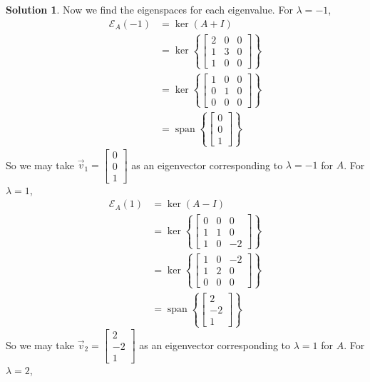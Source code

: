 \documentclass[11pt]{article}
\theoremstyle{definition}\newtheorem{definition}{Definition}
\theoremstyle{definition}\newtheorem{question}{Question}
\theoremstyle{definition}\newtheorem*{solution}{Solution}
\theoremstyle{definition}\newtheorem{example}{Example}
\theoremstyle{definition}\newtheorem{notation}{Notation}
\theoremstyle{theorem}\newtheorem{theorem}{Theorem}
\theoremstyle{theorem}\newtheorem{corollary}{Corollary}
\theoremstyle{theorem}\newtheorem{lemma}{Lemma}
\theoremstyle{theorem}\newtheorem{proposition}{Proposition}
\newcommand{\E}{\mathcal{E}}
\DeclareMathOperator{\Span}{span}
\begin{document}
\begin{solution}
    Now we find the eigenspaces for each eigenvalue. For $\lambda = -1$,
    \begin{align*}
        \E_A(-1) &= \ker(A + I) \\
        &= \ker\left\{\begin{bmatrix} 2 & 0 & 0 \\ 1 & 3 & 0 \\ 1 & 0 & 0 \end{bmatrix}\right\} \\
        &= \ker\left\{\begin{bmatrix} 1 & 0 & 0 \\ 0 & 1 & 0 \\ 0 & 0 & 0 \end{bmatrix}\right\} \\
        &= \Span\left\{\begin{bmatrix} 0 \\ 0 \\ 1 \end{bmatrix}\right\}
    \end{align*}
    So we may take $\vec{v}_1 = \begin{bmatrix} 0 \\ 0 \\ 1 \end{bmatrix}$ as an eigenvector corresponding to $\lambda = -1$ for $A$. For $\lambda = 1$,
    \begin{align*}
        \E_A(1) &= \ker(A - I) \\
        &= \ker\left\{\begin{bmatrix} 0 & 0 & 0 \\ 1 & 1 & 0 \\ 1 & 0 & -2 \end{bmatrix}\right\} \\
        &= \ker\left\{\begin{bmatrix} 1 & 0 & -2 \\ 1 & 2 & 0 \\ 0 & 0 & 0 \end{bmatrix}\right\} \\
        &= \Span\left\{\begin{bmatrix} 2 \\ -2 \\ 1 \end{bmatrix}\right\}
    \end{align*}
    So we may take $\vec{v}_2 = \begin{bmatrix} 2 \\ -2 \\ 1 \end{bmatrix}$ as an eigenvector corresponding to $\lambda = 1$ for $A$. For $\lambda = 2$,

\end{solution}
\end{document}
